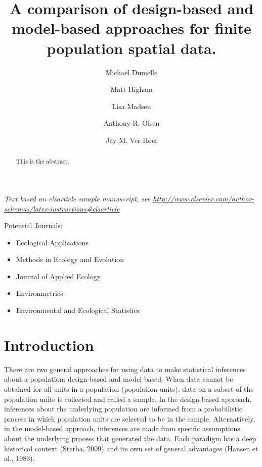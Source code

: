 \documentclass[]{elsarticle} %
\providecommand{\tightlist}{%
  \setlength{\itemsep}{0pt}\setlength{\parskip}{0pt}}
\begin{document}
\begin{frontmatter}

  \title{A comparison of design-based and model-based approaches for finite
population spatial data.}
    \author[USEPA]{Michael Dumelle}
    \author[STLAW]{Matt Higham}
    \author[OSU]{Lisa Madsen}
  
    \author[USEPA]{Anthony R. Olsen}
  
    \author[NOAA]{Jay M. Ver Hoef}
  
      \address[USEPA]{United States Environmental Protection Agency, 200 SW 35th St,
Corvallis, Oregon, 97333}
    \address[STLAW]{Saint Lawrence University Department of Mathematics, Computer Science,
and Statistics, 23 Romoda Drive, Canton, New York, 13617}
    \address[OSU]{Oregon State University Department of Statistics, 239 Weniger Hall,
Corvallis, Oregon, 97331}
    \address[NOAA]{Marine Mammal Laboratory, Alaska Fisheries Science Center, National
Oceanic and Atmospheric Administration, Seattle, Washington, 98115}
  
  \begin{abstract}
  This is the abstract.
  \end{abstract}
  
 \end{frontmatter}

\emph{Text based on elsarticle sample manuscript, see
\url{http://www.elsevier.com/author-schemas/latex-instructions\#elsarticle}}

Potential Journals:

\begin{itemize}
\tightlist
\item
  Ecological Applications
\item
  Methods in Ecology and Evolution
\item
  Journal of Applied Ecology
\item
  Environmetrics
\item
  Environmental and Ecological Statistics
\end{itemize}

\hypertarget{sec:introduction}{%
\section{Introduction}\label{sec:introduction}}

There are two general approaches for using data to make statistical
inferences about a population: design-based and model-based. When data
cannot be obtained for all units in a population (population units),
data on a subset of the population units is collected and called a
sample. In the design-based approach, inferences about the underlying
population are informed from a probabilistic process in which population
units are selected to be in the sample. Alternatively, in the
model-based approach, inferences are made from specific assumptions
about the underlying process that generated the data. Each paradigm has
a deep historical context (Sterba, 2009) and its own set of general
advantages (Hansen et al., 1983).
\end{document}
